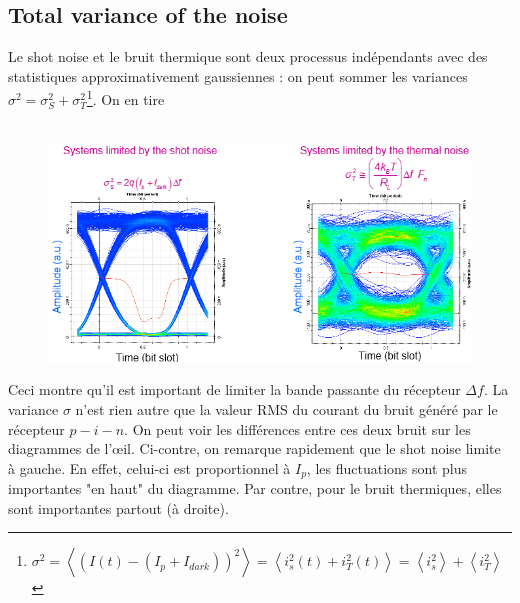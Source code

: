 \subsection{Total variance of the noise}
Le shot noise et le bruit thermique sont deux processus indépendants avec des statistiques 
approximativement gaussiennes : on peut sommer les variances ${\sigma ^2} = \sigma _S^2 
+ \sigma _T^2$\footnote{$\sigma _{}^2 = \left\langle {{{\left( {I(t) - ({I_p} + {I_{dark}})} 
\right)}^2}} \right\rangle  = \left\langle {i_s^2\left( t \right) + i_T^2\left( t \right)} \right
\rangle  = \left\langle {i_s^2} \right\rangle  + \left\langle {i_T^2} \right\rangle$}. On en tire\\

\ \\

\begin{figure}
\includegraphics[scale=0.5]{ch5/image14}
\label{fig:id}
\end{figure}
Ceci montre qu'il est important de limiter la bande passante du récepteur $\Delta f$. La variance
$\sigma$ n'est rien autre que la valeur RMS du courant du bruit généré par le récepteur $p-i-n$. On
peut voir les différences entre ces deux bruit sur les diagrammes de l'œil. Ci-contre, on remarque
rapidement que le shot noise limite à gauche. En effet, celui-ci est proportionnel à $I_p$, les 
fluctuations sont plus importantes "en haut" du diagramme. Par contre, pour le bruit thermiques, 
elles sont importantes partout (à droite).


